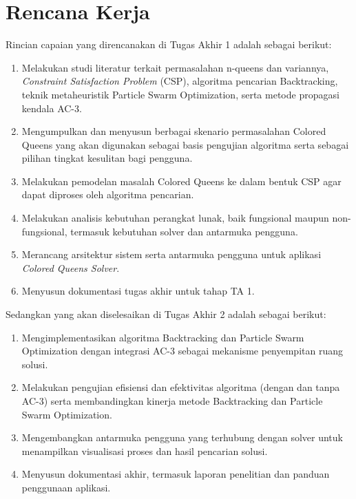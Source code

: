 \documentclass[a4paper,twoside]{article}
\begin{document}
	\section{Rencana Kerja}
	Rincian capaian yang direncanakan di Tugas Akhir 1 adalah sebagai berikut:
	\begin{enumerate}
		\item Melakukan studi literatur terkait permasalahan n-queens dan variannya, \textit{Constraint Satisfaction Problem} (CSP), algoritma pencarian Backtracking, teknik metaheuristik Particle Swarm Optimization, serta metode propagasi kendala AC-3.
		
		\item Mengumpulkan dan menyusun berbagai skenario permasalahan Colored Queens yang akan digunakan sebagai basis pengujian algoritma serta sebagai pilihan tingkat kesulitan bagi pengguna.
		
		\item Melakukan pemodelan masalah Colored Queens ke dalam bentuk CSP agar dapat diproses oleh algoritma pencarian.
		
		\item Melakukan analisis kebutuhan perangkat lunak, baik fungsional maupun non-fungsional, termasuk kebutuhan solver dan antarmuka pengguna.
		
		\item Merancang arsitektur sistem serta antarmuka pengguna untuk aplikasi \textit{Colored Queens Solver}.
		
		\item Menyusun dokumentasi tugas akhir untuk tahap TA 1.
	\end{enumerate}
	
	Sedangkan yang akan diselesaikan di Tugas Akhir 2 adalah sebagai berikut:
	\begin{enumerate}
		\item Mengimplementasikan algoritma Backtracking dan Particle Swarm Optimization dengan integrasi AC-3 sebagai mekanisme penyempitan ruang solusi.
		
		\item Melakukan pengujian efisiensi dan efektivitas algoritma (dengan dan tanpa AC-3) serta membandingkan kinerja metode Backtracking dan Particle Swarm Optimization.
		
		\item Mengembangkan antarmuka pengguna yang terhubung dengan solver untuk menampilkan visualisasi proses dan hasil pencarian solusi.
		
		\item Menyusun dokumentasi akhir, termasuk laporan penelitian dan panduan penggunaan aplikasi.
	\end{enumerate}
	
\end{document}

